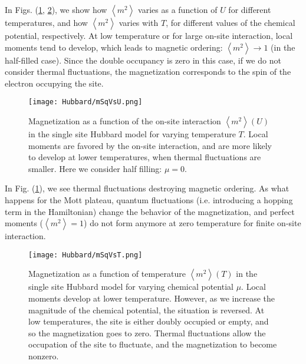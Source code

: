 In Figs. (\ref{fig:mSqVsU}, \ref{fig:mSqVsT}), we show how $\left\langle m^2 \right\rangle$ varies as a function of $U$ for different temperatures, and how $\left\langle m^2 \right\rangle$ varies with $T$, for different values of the chemical potential, respectively.
At low temperature or for large on-site interaction, local moments tend to develop, which leads to magnetic ordering: $\left\langle m^2 \right\rangle \rightarrow 1$ (in the half-filled case).
Since the double occupancy is zero in this case, if we do not consider thermal fluctuations, the magnetization corresponds to the spin of the electron occupying the site.

\begin{figure}[H]
	\centering
\hspace{12mm}\texttt{[image: Hubbard/mSqVsU.png]}
	\caption[Magnetization as a function of the on-site interaction $\left\langle m^2 \right\rangle (U)$ in the single site Hubbard model for varying temperature $T$.]{Magnetization as a function of the on-site interaction $\left\langle m^2 \right\rangle (U)$ in the single site Hubbard model for varying temperature $T$.
	Local moments are favored by the on-site interaction, and are more likely to develop at lower temperatures, when thermal fluctuations are smaller. Here we consider half filling: $\mu = 0$.}
	\label{fig:mSqVsU}
\end{figure}

In Fig. (\ref{fig:mSqVsU}), we see thermal fluctuations destroying magnetic ordering.
As what happens for the Mott plateau, quantum fluctuations (i.e. introducing a hopping term in the Hamiltonian) change the behavior of the magnetization, and perfect moments ($\left\langle m^2 \right\rangle =1$) do not form anymore at zero temperature for finite on-site interaction.

\begin{figure}[H]
	\centering
\hspace{12mm}\texttt{[image: Hubbard/mSqVsT.png]}
	\caption[Magnetization as a function of temperature $\left\langle m^2 \right\rangle (T)$ in the single site Hubbard model for varying chemical potential $\mu$.]{Magnetization as a function of temperature $\left\langle m^2 \right\rangle (T)$ in the single site Hubbard model for varying chemical potential $\mu$.
	Local moments develop at lower temperature.
	However, as we increase the magnitude of the chemical potential, the situation is reversed.
	At low temperatures, the site is either  doubly occupied or empty, and so the magnetization goes to zero.
	Thermal fluctuations allow the occupation of the site to fluctuate, and the magnetization to become nonzero.}
	\label{fig:mSqVsT}
\end{figure}


